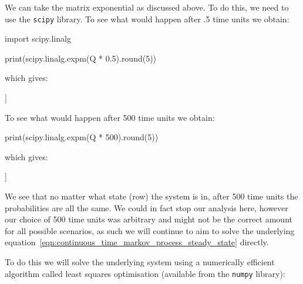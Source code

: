 We can take the matrix exponential as
discussed above. To do this, we need to use the \texttt{scipy}
library. To see what would happen after .5 time units we obtain:
\begin{pyin}
import scipy.linalg

print(scipy.linalg.expm(Q * 0.5).round(5))
\end{pyin}

which gives:

\begin{pyout}
[[0.10492 0.21254 0.20377 0.17142 0.13021 0.09564 0.0815 ]
 [0.08501 0.18292 0.18666 0.1708  0.14377 0.1189  0.11194]
 [0.06521 0.14933 0.16338 0.16478 0.15633 0.14751 0.15346]
 [0.04388 0.10931 0.13183 0.15181 0.16777 0.18398 0.21142]
 [0.02667 0.07361 0.10005 0.13422 0.17393 0.2189  0.27262]
 [0.01567 0.0487  0.07552 0.11775 0.17512 0.24484 0.32239]
 [0.01068 0.03668 0.06286 0.10824 0.17448 0.25791 0.34914]]
\end{pyout}

To see what would happen after 500 time units we obtain:

\begin{pyin}
print(scipy.linalg.expm(Q * 500).round(5))
\end{pyin}

which gives:

\begin{pyout}
[[0.03431 0.08577 0.10722 0.13402 0.16752 0.2094  0.26176]
 [0.03431 0.08577 0.10722 0.13402 0.16752 0.2094  0.26176]
 [0.03431 0.08577 0.10722 0.13402 0.16752 0.2094  0.26176]
 [0.03431 0.08577 0.10722 0.13402 0.16752 0.2094  0.26176]
 [0.03431 0.08577 0.10722 0.13402 0.16752 0.2094  0.26176]
 [0.03431 0.08577 0.10722 0.13402 0.16752 0.2094  0.26176]
 [0.03431 0.08577 0.10722 0.13402 0.16752 0.2094  0.26176]]
\end{pyout}

We see that no matter what state (row) the system is in, after 500 time units
the probabilities are all the same. We could in fact stop our analysis here,
however our choice of 500 time units was arbitrary and might not be the correct
amount for all possible scenarios, as such we will continue to aim to solve the
underlying equation~\ref{eqn:continuous_time_markov_process_steady_state}
directly.

To do this we will solve the underlying system using a numerically efficient
algorithm called least squares optimisation (available from the
\texttt{numpy} library):

